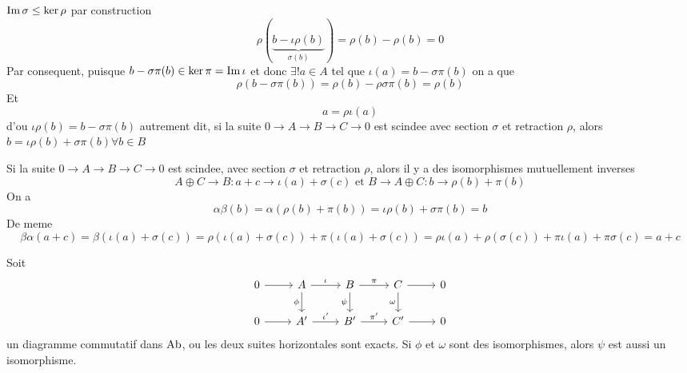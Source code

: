 \documentclass[../main.tex]{subfiles}
\begin{document}
\begin{rmq}
$\operatorname{Im}\sigma \leq \ker\rho$ par construction
\[ 
\rho( \underbrace{b- \iota\rho( b)}_{\sigma( b) }) = \rho( b ) - \rho( b) = 0
\]
Par consequent, puisque $b- \sigma\pi( b) \in \ker\pi= \operatorname{Im}\iota$ et donc $\exists! a\in A$ tel que $\iota( a) =b- \sigma\pi( b) $ on a que
\[ 
\rho( b-\sigma\pi( b) ) = \rho( b) -\rho\sigma\pi( b) = \rho( b) 
\]
Et
\[ 
a= \rho\iota( a) 
\]
d'ou $\iota\rho( b) = b -\sigma\pi( b) $ 
autrement dit, si la suite $0 \to A \to B \to C \to 0$ est scindee avec section $\sigma$ et retraction $\rho$, alors $b = \iota\rho( b) + \sigma\pi( b)\forall b \in B $ 

\end{rmq}
\begin{rmq}
Si la suite $0 \to A \to B \to C\to 0$ est scindee, avec section $\sigma$ et retraction $\rho$, alors il y a des isomorphismes mutuellement inverses
\[ 
A\oplus C \to B : a+ c \to \iota( a) + \sigma( c) \text{ et } B\to A\oplus C: b\to \rho( b) + \pi( b) 
\]
On a 
\[ 
\alpha\beta( b) = \alpha( \rho( b) + \pi( b) ) = \iota\rho( b) + \sigma\pi( b) = b
\]
De meme
\[ 
\beta\alpha( a+c) = \beta( \iota( a) + \sigma( c) ) = \rho( \iota( a) + \sigma( c) ) + \pi( \iota( a) + \sigma( c) ) = \rho\iota( a) + \rho( \sigma( c) ) + \pi\iota( a) + \pi\sigma( c) = a+c
\]


\end{rmq}
\begin{propo}
Soit
\[\begin{tikzcd}
	0 & A & B & C & 0 \\
	0 & {A'} & {B'} & {C'} & 0
	\arrow[from=1-1, to=1-2]
	\arrow["\iota", from=1-2, to=1-3]
	\arrow["\pi", from=1-3, to=1-4]
	\arrow[from=1-4, to=1-5]
	\arrow[from=2-1, to=2-2]
	\arrow["{\iota'}", from=2-2, to=2-3]
	\arrow["{\pi'}", from=2-3, to=2-4]
	\arrow[from=2-4, to=2-5]
	\arrow["\phi"', from=1-2, to=2-2]
	\arrow["\psi"', from=1-3, to=2-3]
	\arrow["\omega"', from=1-4, to=2-4]
\end{tikzcd}\]
un diagramme commutatif dans $\operatorname{Ab}$, ou les deux suites horizontales sont exacts. Si $\phi$ et $\omega$ sont des isomorphismes, alors $\psi$ est aussi un isomorphisme.
\end{propo}
\end{document}
